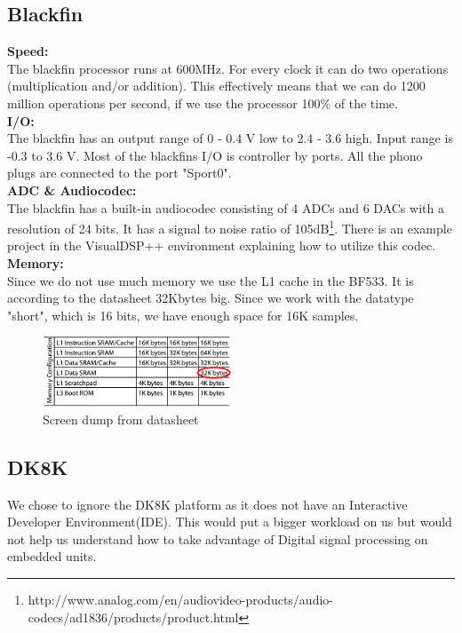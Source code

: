 \subsection{Blackfin}
\textbf{Speed:}\\
The blackfin processor runs at 600MHz. For every clock it can do two operations (multiplication and/or addition). This effectively means that we can do 1200 million operations per second, if we use the processor 100\% of the time.\\
\textbf{I/O:}\\
The blackfin has an output range of 0 - 0.4 V low to 2.4 - 3.6 high. Input range is -0.3 to 3.6 V. Most of the blackfins I/O is controller by ports. All the phono plugs are connected to the port "Sport0". \\
\textbf{ADC \& Audiocodec:}\\
The blackfin has a built-in audiocodec consisting of 4 ADCs and 6 DACs with a resolution of 24 bits. It has a signal to noise ratio of 105dB\footnote{http://www.analog.com/en/audiovideo-products/audio-codecs/ad1836/products/product.html}. There is an example project in the VisualDSP++ environment explaining how to utilize this codec.\\
\textbf{Memory:}\\
Since we do not use much memory we use the L1 cache in the BF533. It is according to the datasheet 32Kbytes big. Since we work with the datatype "short", which is 16 bits, we have enough space for 16K samples.\\
\begin{figure}[hbpt]
\centering
\includegraphics[width=0.5\textwidth]{billeder/memorytable}
\caption[Screen dump from datasheet]{Screen dump from datasheet\footnotemark}
\label{img:mem_table}
\end{figure}
\subsection{DK8K}
We chose to ignore the DK8K platform as it does not have an Interactive Developer Environment(IDE). This would put a bigger workload on us but would not help us understand how to take advantage of Digital signal processing on embedded units.



